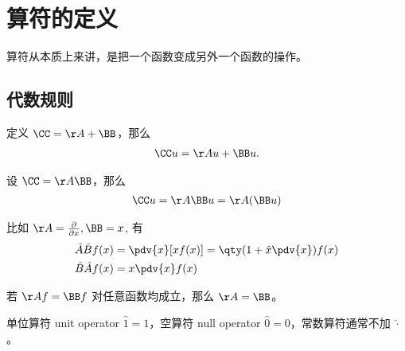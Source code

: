 
\section{算符的定义}
算符从本质上来讲，是把一个函数变成另外一个函数的操作。
\subsection{代数规则}

\begin{theorem}[算符的和与差]
    定义 $\CC = \AA + \BB$，那么
\begin{eqnarray}
    \CC u = \AA u + \BB u. 
\end{eqnarray}
\end{theorem}

\begin{theorem}[算符的乘法]
    设 $\CC = \AA \BB$，那么
\begin{eqnarray}
    \CC u = \AA\BB u = \AA (\BB u)
\end{eqnarray}
\end{theorem}


比如 $\AA = \frac{\partial}{\partial x}, \BB=x$, 有
\begin{align}
    \hat A \hat B f(x) &= \pdv{x} [x f(x)] = \qty(1 + \hat x \pdv{x}) f(x) \\
    \hat B \hat A f(x) &= x \pdv{x} f(x)
\end{align}

\begin{theorem}[等价算符]
    若 $\AA f=\BB f$ 对任意函数均成立，那么 $\AA =\BB$。
\end{theorem}

\begin{theorem}[基本算符]
    单位算符 unit operator $\hat 1 = 1$，空算符 null operator $\hat 0 = 0$，常数算符通常不加 $\hat\cdot$。
\end{theorem}

